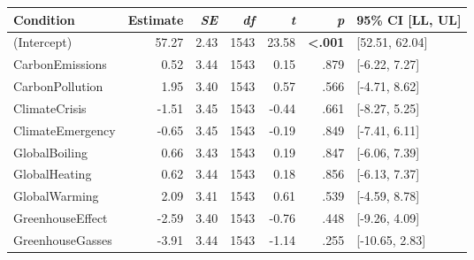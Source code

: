\begin{table}[ht]
\centering
\begin{tabular}{lrrrrrl}
  \hline
Condition & Estimate & \textit{SE} & \textit{df} & \textit{t} & \textit{p} & 95\% CI [LL, UL] \\ 
  \hline
(Intercept) & 57.27 & 2.43 & 1543 & 23.58 & \textbf{\textless  .001} & [52.51, 62.04] \\ 
  CarbonEmissions & 0.52 & 3.44 & 1543 & 0.15 & .879 & [-6.22, 7.27] \\ 
  CarbonPollution & 1.95 & 3.40 & 1543 & 0.57 & .566 & [-4.71, 8.62] \\ 
  ClimateCrisis & -1.51 & 3.45 & 1543 & -0.44 & .661 & [-8.27, 5.25] \\ 
  ClimateEmergency & -0.65 & 3.45 & 1543 & -0.19 & .849 & [-7.41, 6.11] \\ 
  GlobalBoiling & 0.66 & 3.43 & 1543 & 0.19 & .847 & [-6.06, 7.39] \\ 
  GlobalHeating & 0.62 & 3.44 & 1543 & 0.18 & .856 & [-6.13, 7.37] \\ 
  GlobalWarming & 2.09 & 3.41 & 1543 & 0.61 & .539 & [-4.59, 8.78] \\ 
  GreenhouseEffect & -2.59 & 3.40 & 1543 & -0.76 & .448 & [-9.26, 4.09] \\ 
  GreenhouseGasses & -3.91 & 3.44 & 1543 & -1.14 & .255 & [-10.65, 2.83] \\ 
   \hline
\end{tabular}
\end{table}
